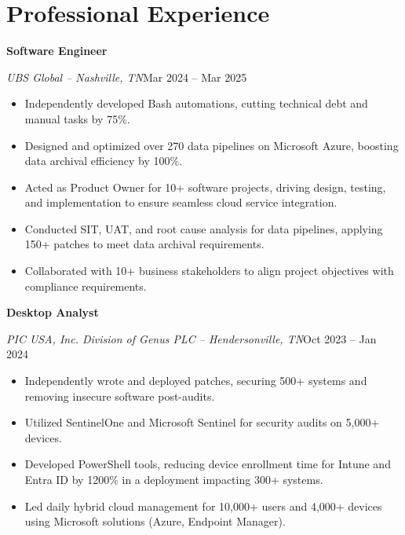 \documentclass[a4paper]{article}
\begin{document}
\begin{minipage}[t]{0.62\textwidth}
    \raggedright
    \vspace*{0pt}

    \section{Professional Experience}
    \textbf{Software Engineer}\par
    \textit{UBS Global -- Nashville, TN}\hfill Mar 2024 -- Mar 2025

    \begin{itemize}[noitemsep,nolistsep]
        \item Independently developed Bash automations, cutting technical debt and manual tasks by 75\%.
        \item Designed and optimized over 270 data pipelines on Microsoft Azure, boosting data archival efficiency by 100\%.
        \item Acted as Product Owner for 10+ software projects, driving design, testing, and implementation to ensure seamless cloud service integration.
        \item Conducted SIT, UAT, and root cause analysis for data pipelines, applying 150+ patches to meet data archival requirements.
        \item Collaborated with 10+ business stakeholders to align project objectives with compliance requirements.
    \end{itemize}

    \vspace{0.5em}
    \textbf{Desktop Analyst}\par
    \textit{PIC USA, Inc. Division of Genus PLC -- Hendersonville, TN}\hfill Oct 2023 -- Jan 2024

    \begin{itemize}[noitemsep,nolistsep]
        \item Independently wrote and deployed patches, securing 500+ systems and removing insecure software post-audits.
        \item Utilized SentinelOne and Microsoft Sentinel for security audits on 5,000+ devices.
        \item Developed PowerShell tools, reducing device enrollment time for Intune and Entra ID by 1200\% in a deployment impacting 300+ systems.
        \item Led daily hybrid cloud management for 10,000+ users and 4,000+ devices using Microsoft solutions (Azure, Endpoint Manager).
    \end{itemize}


\end{minipage}
\end{document}
